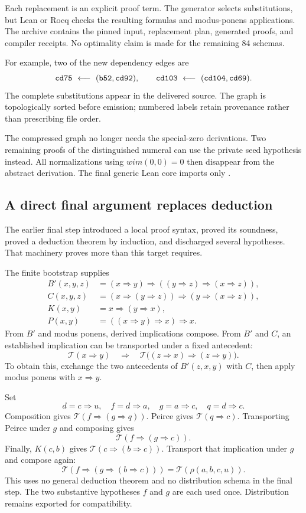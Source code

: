 \documentclass[11pt]{article}
\theoremstyle{definition}\newtheorem{definition}[theorem]{Definition}
\newcommand{\impop}{\mathbin{\Rightarrow}}
\newcommand{\Rho}[4]{\rho(#1,#2,#3,#4)}
\newcommand{\T}{\mathcal T}
\newcommand{\code}[1]{\texttt{\detokenize{#1}}}
\begin{document}
Each replacement is an explicit proof term. The generator selects substitutions, but Lean or Rocq checks the resulting formulas and modus-ponens applications. The archive contains the pinned input, replacement plan, generated proofs, and compiler receipts. No optimality claim is made for the remaining 84 schemas.

For example, two of the new dependency edges are
\[
 \code{cd75}\ \longleftarrow\ (\code{b52},\code{cd92}),\qquad
 \code{cd103}\ \longleftarrow\ (\code{cd104},\code{cd69}).
\]
The complete substitutions appear in the delivered source. The graph is topologically sorted before emission; numbered labels retain provenance rather than prescribing file order.

The compressed graph no longer needs the special-zero derivations. Two remaining proofs of the distinguished numeral can use the private seed hypothesis instead. All normalizations using $wim(0,0)=0$ then disappear from the abstract derivation. The final generic Lean core imports only \code{Init}.

\subsection{A direct final argument replaces deduction}
\label{sec:direct}
The earlier final step introduced a local proof syntax, proved its soundness, proved a deduction theorem by induction, and discharged several hypotheses. That machinery proves more than this target requires.

The finite bootstrap supplies
\begin{align*}
 B'(x,y,z)&=(x\impop y)\impop((y\impop z)\impop(x\impop z)),\\
 C(x,y,z)&=(x\impop(y\impop z))\impop(y\impop(x\impop z)),\\
 K(x,y)&=x\impop(y\impop x),\\
 P(x,y)&=((x\impop y)\impop x)\impop x.
\end{align*}
From $B'$ and modus ponens, derived implications compose. From $B'$ and $C$, an established implication can be transported under a fixed antecedent:
\[
 \T(x\impop y)\quad\Longrightarrow\quad
 \T\bigl((z\impop x)\impop(z\impop y)\bigr).
\]
To obtain this, exchange the two antecedents of $B'(z,x,y)$ with $C$, then apply modus ponens with $x\impop y$.

Set
\[
 d=c\impop u,\quad f=d\impop a,\quad g=a\impop c,\quad q=d\impop c.
\]
Composition gives $\T(f\impop(g\impop q))$. Peirce gives $\T(q\impop c)$. Transporting Peirce under $g$ and composing gives
\[
 \T(f\impop(g\impop c)).
\]
Finally, $K(c,b)$ gives $\T(c\impop(b\impop c))$. Transport that implication under $g$ and compose again:
\[
 \T(f\impop(g\impop(b\impop c)))
   =\T(\Rho{a}{b}{c}{u}).
\]
This uses no general deduction theorem and no distribution schema in the final step. The two substantive hypotheses $f$ and $g$ are each used once. Distribution remains exported for compatibility.
\end{document}
